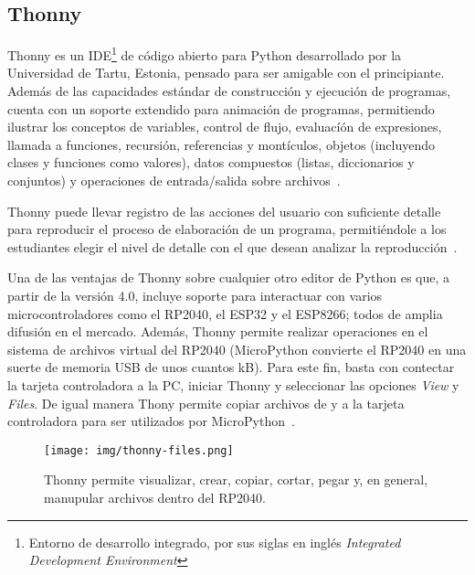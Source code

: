 %
%



\subsection{Thonny}%
\label{sec:intro-thonny}

Thonny es un IDE\footnote{Entorno de desarrollo integrado, por sus siglas en inglés \emph{Integrated Development Environment}}
de código abierto
para Python desarrollado por la Universidad de Tartu, Estonia, pensado para ser amigable con el principiante.
Además de las capacidades estándar de construcción y ejecución de programas, cuenta con un soporte extendido para animación de programas,
permitiendo ilustrar los conceptos de variables, control de flujo, evaluacíón de expresiones, llamada a funciones, recursión, referencias y montículos, objetos (incluyendo clases y funciones como valores), datos compuestos (listas, diccionarios y conjuntos) y operaciones de entrada/salida sobre archivos~.

Thonny puede llevar registro de las acciones del usuario con suficiente detalle para reproducir el proceso de elaboración de un programa, permitiéndole a los estudiantes elegir el nivel de detalle con el que desean analizar la reproducción~.

Una de las ventajas de Thonny sobre cualquier otro editor de Python es que, a partir de la versión 4.0, incluye soporte para interactuar con varios  microcontroladores como el RP2040, el ESP32 y el ESP8266; todos de amplia difusión en el mercado.
Además, Thonny permite realizar operaciones en el sistema de archivos virtual del RP2040 (MicroPython convierte el RP2040 en una suerte de memoria USB de unos cuantos kB).
Para este fin, basta con contectar la tarjeta controladora a la PC, iniciar Thonny y seleccionar las opciones \emph{View} y \emph{Files}.
De igual manera Thony permite copiar archivos de y a la tarjeta controladora para ser utilizados por MicroPython~\cite{bell2022MicroPython,bell2022}.

\begin{figure}[H]
	\centering%
	\texttt{[image: img/thonny-files.png]} %
	\caption{Thonny permite visualizar, crear, copiar, cortar, pegar y, en general, manupular archivos dentro del RP2040.}
	\label{fig:thonny} %
\end{figure}
